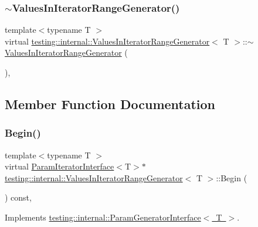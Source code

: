 \subsubsection{\texorpdfstring{$\sim$ValuesInIteratorRangeGenerator()}{~ValuesInIteratorRangeGenerator()}}
{\footnotesize\ttfamily template$<$typename T $>$ \\
virtual \mbox{\hyperlink{classtesting_1_1internal_1_1ValuesInIteratorRangeGenerator}{testing\+::internal\+::\+Values\+In\+Iterator\+Range\+Generator}}$<$ T $>$\+::$\sim$\mbox{\hyperlink{classtesting_1_1internal_1_1ValuesInIteratorRangeGenerator}{Values\+In\+Iterator\+Range\+Generator}} (\begin{DoxyParamCaption}{ }\end{DoxyParamCaption})\hspace{0.3cm}{\ttfamily [inline]}, {\ttfamily [virtual]}}



\subsection{Member Function Documentation}
\mbox{\label{classtesting_1_1internal_1_1ValuesInIteratorRangeGenerator_a91dac42f069cd06d05348fe5dd78639b}} 
\subsubsection{\texorpdfstring{Begin()}{Begin()}}
{\footnotesize\ttfamily template$<$typename T $>$ \\
virtual \mbox{\hyperlink{classtesting_1_1internal_1_1ParamIteratorInterface}{Param\+Iterator\+Interface}}$<$T$>$$\ast$ \mbox{\hyperlink{classtesting_1_1internal_1_1ValuesInIteratorRangeGenerator}{testing\+::internal\+::\+Values\+In\+Iterator\+Range\+Generator}}$<$ T $>$\+::Begin (\begin{DoxyParamCaption}{ }\end{DoxyParamCaption}) const\hspace{0.3cm}{\ttfamily [inline]}, {\ttfamily [virtual]}}



Implements \mbox{\hyperlink{classtesting_1_1internal_1_1ParamGeneratorInterface_ae1de83b16fe9a53c67778a026c6a9569}{testing\+::internal\+::\+Param\+Generator\+Interface$<$ T $>$}}.

